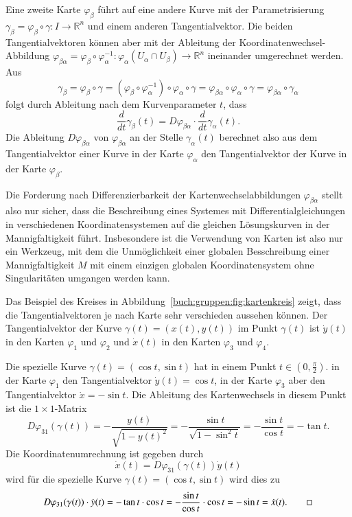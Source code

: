 Eine zweite Karte $\varphi_\beta$ führt auf eine andere Kurve
mit der Parametrisierung
$\gamma_\beta=\varphi_\beta\circ\gamma\colon I \to \mathbb{R}^n$ 
und einem anderen Tangentialvektor.
Die beiden Tangentialvektoren können aber mit der Ableitung der
Koordinatenwechsel-Abbildung
$\varphi_{\beta\alpha}=\varphi_\beta\circ\varphi_\alpha^{-1}\colon
\varphi_\alpha(U_\alpha\cap U_\beta)\to \mathbb{R}^n$
ineinander umgerechnet werden.
Aus
\[
\gamma_\beta
=
\varphi_\beta\circ \gamma
=
(
\varphi_\beta
\circ
\varphi_\alpha^{-1}
)
\circ
\varphi_\alpha\circ\gamma
=
\varphi_{\beta\alpha}
\circ
\varphi_\alpha\circ\gamma
=
\varphi_{\beta\alpha}\circ\gamma_\alpha
\]
folgt durch Ableitung nach dem Kurvenparameter $t$, dass
\[
\frac{d}{dt}\gamma_\beta(t)
=
D\varphi_{\beta\alpha}
\cdot
\frac{d}{dt}\gamma_\alpha(t).
\]
Die Ableitung $D\varphi_{\beta\alpha}$ von $\varphi_{\beta\alpha}$ 
an der Stelle $\gamma_\alpha(t)$ berechnet also aus dem Tangentialvektor
einer Kurve in der Karte $\varphi_\alpha$ den Tangentialvektor der
Kurve in der Karte $\varphi_\beta$.

Die Forderung nach Differenzierbarkeit der Kartenwechselabbildungen
$\varphi_{\beta\alpha}$ stellt also nur sicher, dass die Beschreibung
eines Systemes mit Differentialgleichungen in verschiedenen
Koordinatensystemen auf die gleichen Lösungskurven in der
Mannigfaltigkeit führt.
Insbesondere ist die Verwendung von Karten ist also nur ein Werkzeug,
mit dem die Unmöglichkeit einer globalen Besschreibung einer
Mannigfaltigkeit $M$ mit einem einzigen globalen Koordinatensystem
ohne Singularitäten umgangen werden kann.

\begin{beispiel}
Das Beispiel des Kreises in Abbildung~\ref{buch:gruppen:fig:kartenkreis}
zeigt, dass die Tangentialvektoren je nach Karte sehr verschieden
aussehen können.
Der Tangentialvektor der Kurve $\gamma(t) = (x(t), y(t))$ im Punkt
$\gamma(t)$ ist $\dot{y}(t)$ in den Karten $\varphi_1$ und $\varphi_2$ 
und $\dot{x}(t)$ in den Karten $\varphi_3$ und $\varphi_4$.

Die spezielle Kurve $\gamma(t) = (\cos t,\sin t)$ hat in einem Punkt
$t\in (0,\frac{\pi}2)$.
in der Karte $\varphi_1$ den Tangentialvektor $\dot{y}(t)=\cos t$,
in der Karte $\varphi_3$ aber den Tangentialvektor $\dot{x}=-\sin t$.
Die Ableitung des Kartenwechsels in diesem Punkt ist die $1\times 1$-Matrix
\[
D\varphi_{31}(\gamma(t))
=
-\frac{y(t)}{\sqrt{1-y(t)^2}}
=
-\frac{\sin t}{\sqrt{1-\sin^2 t}}
=
-\frac{\sin t}{\cos t}
=
-\tan t.
\]
Die Koordinatenumrechnung ist gegeben durch
\[
\dot{x}(t)
=
D\varphi_{31}(\gamma(t)) 
\dot{y}(t)
\]
wird für die spezielle Kurve $\gamma(t)=(\cos t,\sin t)$ wird dies zu
\[
D\varphi_{31}(\gamma(t)) 
\cdot
\dot{y}(t)
=
-\tan t\cdot \cos t
=
-\frac{\sin t}{\cos t}\cdot \cos t
=
-\sin t
=
\dot{x}(t).
\qedhere
\]
\end{beispiel}

